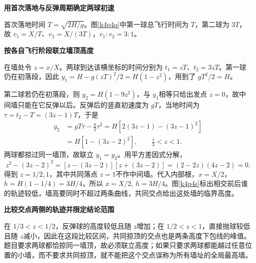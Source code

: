 \begin{solution}\textbf{用首次落地与反弹周期确定两球初速}\par\nobreak
首次落地时间 $T=\sqrt{2H/g}$。图\ref{k4p4q}中第一球总飞行时间为 $T$，第二球为 $3T$，故 $v_1=X/T$、$v_2=X/(3T)$，$\boxed{v_1:v_2=3:1}$。



\par\medskip{}\noindent\textbf{按各自飞行阶段联立墙顶高度}\par\nobreak
在墙处令 $z=x/X$。两球到达该横坐标的时间分别为 $t_1=zT$、$t_2=3zT$。第一球仍在初落段，因此 $y_1=H-g(zT)^2/2=H(1-z^2)$，用到了 $gT^2/2=H$。

第二球若仍在初落段，则 $y_2=H(1-9z^2)$，与 $y_1$相等只给出发点 $z=0$，故中间墙只能在它反弹以后。反弹后的竖直初速度为 $gT$，当地时间为 $\tau=t_2-T=(3z-1)T$，于是
\begin{align*}
 y_2&=gT\tau-\frac g2\tau^2
 =H[2(3z-1)-(3z-1)^2]\\
 &=H[1-(3z-2)^2],\qquad \frac13<z<1.
\end{align*}
两球都掠过同一墙顶，故联立 $y_1=y_2$。用平方差因式分解，
\[
 z^2-(3z-2)^2=[z-(3z-2)][z+(3z-2)]
 =(2-2z)(4z-2)=0.
\]
得到 $z=1/2,1$，其中共同落点 $z=1$不作中间墙。代入内部根，$x=X/2$，$h=H(1-1/4)=3H/4$，所以 $\boxed{x=X/2,\ h=3H/4}$。图\ref{k4p4s}标出相交前后谁的轨迹较低，墙高要同时不超过两条曲线，共同交点给出这处墙的临界高度。



\par\medskip{}\noindent\textbf{比较交点两侧的轨迹并限定结论范围}\par\nobreak
在 $1/3<z<1/2$，反弹球的高度较低且随 $z$增加；在 $1/2<z<1$，直接抛球较低且随 $z$减小，因此在这段比较区间，共同掠顶的交点也是两条高度下包线的峰值。题目要求两球都恰掠同一墙顶，故必须联立高度；如果只要求两球都能越过任意位置的小墙，而不要求共同掠顶，就不能把这个交点误称为所有墙址的全局最高墙。\end{solution}

